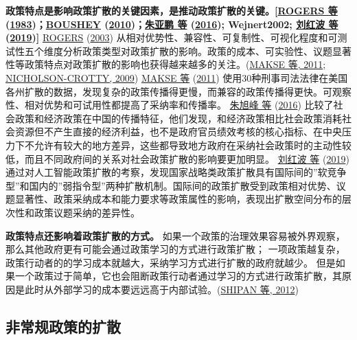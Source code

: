 \documentclass[
  12pt,
]{ctexart}
\begin{document}
\textbf{政策特点是影响政策扩散的关键因素，是推动政策扩散的关键。{[}\protect\hyperlink{ref-RogersChaffee1983}{ROGERS 等} (\protect\hyperlink{ref-RogersChaffee1983}{1983})；\protect\hyperlink{ref-Boushey2010}{BOUSHEY} (\protect\hyperlink{ref-Boushey2010}{2010})；\protect\hyperlink{ref-ZhuYaPengDingShuJuan2016}{朱亚鹏 等} (\protect\hyperlink{ref-ZhuYaPengDingShuJuan2016}{2016}); Wejnert2002; \protect\hyperlink{ref-LiuHongBoLinBin2019}{刘红波 等} (\protect\hyperlink{ref-LiuHongBoLinBin2019}{2019}){]}}
\protect\hyperlink{ref-Rogers2003}{ROGERS} (\protect\hyperlink{ref-Rogers2003}{2003}) 从相对优势性、兼容性、可复制性、可视化程度和可测试性五个维度分析政策类型对政策扩散的影响。政策的成本、可实验性、议题显著性等政策特点对政策扩散的影响也获得越来越多的关注。(\protect\hyperlink{ref-MakseVolden2011}{MAKSE 等, 2011}; \protect\hyperlink{ref-Nicholson-Crotty2009}{NICHOLSON-CROTTY, 2009})
\protect\hyperlink{ref-MakseVolden2011}{MAKSE 等} (\protect\hyperlink{ref-MakseVolden2011}{2011}) 使用30种刑事司法法律在美国各州扩散的数据，发现复杂的政策传播得更慢，而兼容的政策传播得更快。可观察性、相对优势和可试用性都提高了采纳率和传播率。
\protect\hyperlink{ref-ZhuXuFengZhaoHui2016}{朱旭峰 等} (\protect\hyperlink{ref-ZhuXuFengZhaoHui2016}{2016}) 比较了社会政策和经济政策在中国的传播特征，他们发现，和经济政策相比社会政策消耗社会资源但不产生直接的经济利益，也不是政府官员绩效考核的核心指标、在中央压力下不允许有较大的地方差异，这些都导致地方政府在采纳社会政策时的主动性较低，而且不同政府间的关系对社会政策扩散的影响要更加明显。
\protect\hyperlink{ref-LiuHongBoLinBin2019}{刘红波 等} (\protect\hyperlink{ref-LiuHongBoLinBin2019}{2019}) 通过对人工智能政策扩散的考察，发现国家战略类政策扩散具有国际间的''软竞争型''和国内的''弱指令型''两种扩散机制。国际间的政策扩散受到政策相对优势、议题显著性、政策采纳成本和能力要求等政策属性的影响，表现出扩散空间分布的层次性和政策议题采纳的差异性。

\textbf{政策特点还影响着政策扩散的方式。}
如果一个政策的治理效果容易被外界观察，那么其他政府更有可能会通过政策学习的方式进行政策扩散；
一项政策越复杂，政策行动者的的学习成本就越大，采纳学习方式进行扩散的政府就越少。
但是如果一个政策过于简单，它也会阻断政策行动者通过学习的方式进行政策扩散，其原因是此时从外部学习的成本要远远高于内部试验。(\protect\hyperlink{ref-ShipanVolden2012}{SHIPAN 等, 2012})

\hypertarget{ux975eux5e38ux89c4ux653fux7b56ux7684ux6269ux6563}{%
\subsection{非常规政策的扩散}\label{ux975eux5e38ux89c4ux653fux7b56ux7684ux6269ux6563}}
\end{document}

